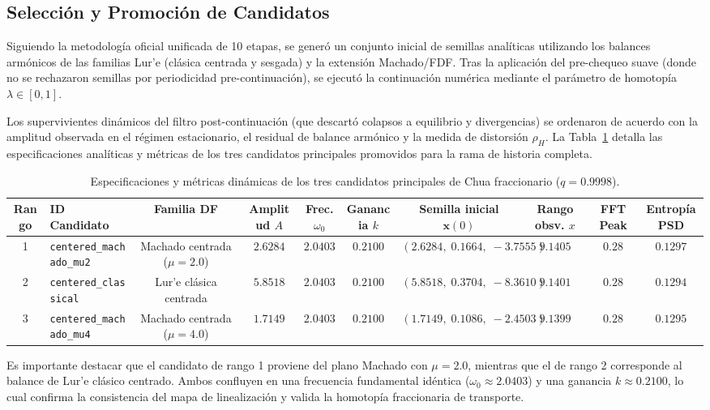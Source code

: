 \documentclass[journal]{IEEEtran}
\begin{document}
\subsection{Selección y Promoción de Candidatos}
Siguiendo la metodología oficial unificada de 10 etapas, se generó un conjunto inicial de semillas analíticas utilizando los balances armónicos de las familias Lur'e (clásica centrada y sesgada) y la extensión Machado/FDF. Tras la aplicación del pre-chequeo suave (donde no se rechazaron semillas por periodicidad pre-continuación), se ejecutó la continuación numérica mediante el parámetro de homotopía $\lambda\in[0,1]$.

Los supervivientes dinámicos del filtro post-continuación (que descartó colapsos a equilibrio y divergencias) se ordenaron de acuerdo con la amplitud observada en el régimen estacionario, el residual de balance armónico y la medida de distorsión $\rho_H$. La Tabla~\ref{tab:candidatos_frac_chua} detalla las especificaciones analíticas y métricas de los tres candidatos principales promovidos para la rama de historia completa.

\begin{table}[htbp]
\centering
\caption{Especificaciones y métricas dinámicas de los tres candidatos principales de Chua fraccionario ($q=0.9998$).}
\label{tab:candidatos_frac_chua}
\small
\begin{tabular}{clcccccccc}
\toprule
\textbf{Rango} & \textbf{ID Candidato} & \textbf{Familia DF} & \textbf{Amplitud $A$} & \textbf{Frec. $\omega_0$} & \textbf{Ganancia $k$} & \textbf{Semilla inicial $\bm{x}(0)$} & \textbf{Rango obsv. $x$} & \textbf{FFT Peak} & \textbf{Entropía PSD} \\
\midrule
1 & \texttt{centered\_machado\_mu2} & Machado centrada ($\mu=2.0$) & $2.6284$ & $2.0403$ & $0.2100$ & $(2.6284,\; 0.1664,\; -3.7555)$ & $9.1405$ & $0.28$ & $0.1297$ \\
2 & \texttt{centered\_classical} & Lur'e clásica centrada & $5.8518$ & $2.0403$ & $0.2100$ & $(5.8518,\; 0.3704,\; -8.3610)$ & $9.1401$ & $0.28$ & $0.1294$ \\
3 & \texttt{centered\_machado\_mu4} & Machado centrada ($\mu=4.0$) & $1.7149$ & $2.0403$ & $0.2100$ & $(1.7149,\; 0.1086,\; -2.4503)$ & $9.1399$ & $0.28$ & $0.1295$ \\
\bottomrule
\end{tabular}
\end{table}

Es importante destacar que el candidato de rango 1 proviene del plano Machado con $\mu=2.0$, mientras que el de rango 2 corresponde al balance de Lur'e clásico centrado. Ambos confluyen en una frecuencia fundamental idéntica ($\omega_0\approx 2.0403$) y una ganancia $k\approx 0.2100$, lo cual confirma la consistencia del mapa de linealización y valida la homotopía fraccionaria de transporte.
\end{document}
